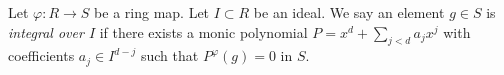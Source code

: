\begin{definition}
\label{definition-integral-over-ideal}
Let $\varphi : R \to S$ be a ring map.
Let $I \subset R$ be an ideal.
We say an element $g \in S$ is
{\it integral over $I$} if
there exists a monic
polynomial $P = x^d + \sum_{j < d} a_j x^j$
with coefficients $a_j \in I^{d-j}$ such
that $P^\varphi(g) = 0$ in $S$.
\end{definition}
